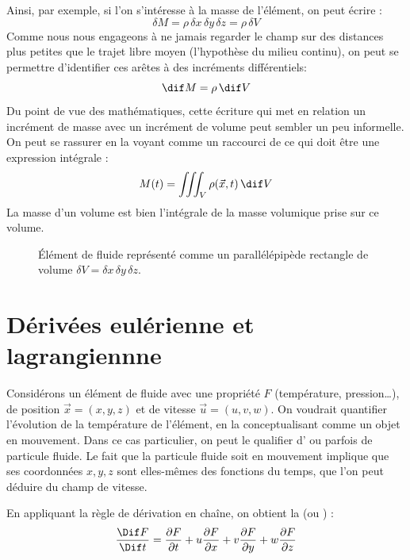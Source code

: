 Ainsi, par exemple, si l’on s’intéresse à la masse de l'élément, on peut écrire :
\begin{equation}
\delta M = \rho \, \delta x \, \delta y \, \delta z = \rho \, \delta V
\label{eq:mass_element}
\end{equation}
Comme nous nous engageons à ne jamais regarder le champ sur des distances plus petites que le trajet libre moyen (l'hypothèse du milieu continu), on peut se permettre d’identifier ces arêtes à des incréments différentiels:
\begin{equation}
\dif M = \rho \, \dif V
\label{eq:diff_mass}
\end{equation}
Du point de vue des mathématiques, cette écriture qui met en relation un incrément de masse avec un incrément de volume peut sembler un peu informelle. On peut se rassurer en la voyant comme un raccourci de ce qui doit être une expression intégrale :
\begin{equation}
M(t) = \iiint_V \rho(\vec{x}, t) \, \dif V
\label{eq:integral_mass}
\end{equation}
La masse d’un volume est bien l’intégrale de la masse volumique prise sur ce volume.  

\begin{figure}

\caption{Élément de fluide représenté comme un parallélépipède rectangle de volume $\delta V = \delta x\,\delta y\,\delta z$.}
\end{figure}


\section{Dérivées eulérienne et lagrangiennne}

Considérons un élément de fluide avec une propriété $F$ (température, pression\ldots), de position $\vec{x}=(x,y,z)$ et de vitesse $\vec{u}=(u,v,w)$.  
On voudrait quantifier l’évolution de la température de l'élément, en la conceptualisant comme un objet en mouvement. Dans ce cas particulier, on peut le qualifier d' ou parfois de particule fluide. 
Le fait que la particule fluide soit en mouvement implique que ses coordonnées $x,y,z$ sont elles-mêmes des fonctions du temps, que l’on peut déduire du champ de vitesse.

En appliquant la règle de dérivation en chaîne, on obtient la  (ou ) :
\begin{equation}
\frac{\Dif F}{\Dif t} = 
\frac{\partial F}{\partial t} +
u \frac{\partial F}{\partial x} +
v \frac{\partial F}{\partial y} +
w \frac{\partial F}{\partial z}
\label{eq:material_derivative}
\end{equation}

